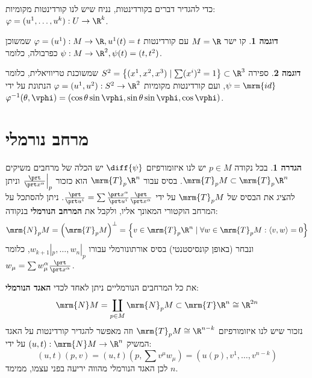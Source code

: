 \documentclass{article}
\theoremstyle{definition}
\newtheorem*{definition*}{הגדרה}
\newtheorem*{example*}{דוגמה}
\begin{document}
	כדי להגדיר דברים בקורדינטות, נניח שיש לנו קורדינטות מקומיות:
	\(\varphi=(u^1,\dotsc,u^k): U \to \R^k\).
	
	\begin{example*}
		קו ישר
		\(M = \R\)
		עם קורדינטות
		\(\varphi=(u^1): M \to \R, u^1(t)=t\)
		שמשוכן כפרבולה, כלומר
		\(\psi: M \to \R^2, \psi(t) = (t,t^2)\).
	\end{example*}
	
	\begin{example*}
		ספירה
		\(S^2 = \left\{(x^1,x^2,x^3) \mid \sum (x^i)^2 = 1 \right\} \subset \R^3 \)
		שמשוכנת טריוויאלית, כלומר
		\(\psi = \mrm{id}\),
		ועם קורדינטות מקומיות
		\(\varphi=(u^1,u^2): S^2 \to \R^2\)
		הנתונת על ידי
		\(
			\varphi^{-1}(\theta, \vphi) = \left(
				\cos\theta \sin\vphi,
				\sin\theta \sin\vphi,
				\cos\vphi
			\right)
		\).
	\end{example*}




	\section{מרחב נורמלי}
	
	\begin{definition*}
		בכל נקודה
		$p\in M$
		יש לנו איזומורפיזם
		\(\diff{\psi}\)
		יש הכלה של מרחבים משיקים
		\(\mrm{T}_p M \subset \mrm{T}_p \R^n\).
		בסיס עבור
		\(\mrm{T}_p \R^n\)
		הוא כזכור
		\(\frac{\prt}{\prt x^\alpha}\Big|_p\)
		וניתן להציג את הבסיס של
		\(\mrm{T}_p M\)
		על ידי
		\(\frac{\prt}{\prt u^i} = \sum \frac{\prt x^\alpha}{\prt u^i} \frac{\prt}{\prt x^\alpha}\).
		ניתן להסתכל על המרחב הוקטורי המאונך אליו, ולקבל את \textbf{המרחב הנורמלי} בנקודה:
		\[
			\mrm{N}_p M
			= \left(\mrm{T}_p M\right)^\bot
			= \left\{
				v \in \mrm{T}_p \R^n
				\mid
				\forall w \in \mrm{T}_p M: \langle v,w \rangle=0
			\right\}
		\]
		ונבחר (באופן קונסיסטנטי) בסיס אורתונורמלי עבורו
		\(w_{k+1}|_p,\dotsc,w_{n}|_p\),
		כלומר
		\(w_\mu=\sum w_\mu^\alpha \frac{\prt}{\prt x^\alpha}\).
		
		את כל המרחבים הנורמליים ניתן לאחד לכדי \textbf{האגד הנורמלי}:
		\[
			\mrm{N} M
			= \coprod_{p \in M} \mrm{N}_p M
			\subset \mrm{T} \R^n
			\cong \R^{2n}
		\]
		נזכור שיש לנו איזומורפיזם
		\(\mrm{T}_p M \cong \R^{n-k}\)
		וזה מאפשר להגדיר קורדינטות על האגד המשיק
		\((u,t): \mrm{N} M \to \R^n\)
		על ידי:
		\[
		(u,t)(p,v)
		= (u,t)(p,\sum v^\mu w_\mu)
		= (u(p),v^1,\dotsc,v^{n-k})
		\]
		לכן האגד הנורמלי מהווה יריעה בפני עצמו, ממימד \(n\).
	\end{definition*}
\end{document}
